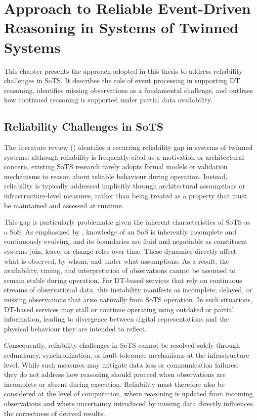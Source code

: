 \chapter{Approach to Reliable Event-Driven Reasoning in Systems of Twinned Systems}\label{ch:approach}
This chapter presents the approach adopted in this thesis to address reliability challenges in SoTS. It describes the role of event processing in supporting DT reasoning, identifies missing observations as a fundamental challenge, and outlines how continued reasoning is supported under partial data availability.



\section{Reliability Challenges in SoTS}

The literature review () identifies a recurring reliability gap in systems of twinned systems: although reliability is frequently cited as a motivation or architectural concern, existing SoTS research rarely adopts formal models or validation mechanisms to reason about reliable behaviour during operation. Instead, reliability is typically addressed implicitly through architectural assumptions or infrastructure-level measures, rather than being treated as a property that must be maintained and assessed at runtime.

This gap is particularly problematic given the inherent characteristics of SoTS as a SoS. As emphasized by \citet{jamshidi2008system}, knowledge of an SoS is inherently incomplete and continuously evolving, and its boundaries are fluid and negotiable as constituent systems join, leave, or change roles over time. These dynamics directly affect what is observed, by whom, and under what assumptions. As a result, the availability, timing, and interpretation of observations cannot be assumed to remain stable during operation. For DT-based services that rely on continuous streams of observational data, this instability manifests as incomplete, delayed, or missing observations that arise naturally from SoTS operation. In such situations, DT-based services may stall or continue operating using outdated or partial information, leading to divergence between digital representations and the physical behaviour they are intended to reflect.

Consequently, reliability challenges in SoTS cannot be resolved solely through redundancy, synchronization, or fault-tolerance mechanisms at the infrastructure level. While such measures may mitigate data loss or communication failures, they do not address how reasoning should proceed when observations are incomplete or absent during execution. Reliability must therefore also be considered at the level of computation, where  reasoning is updated from incoming observations and where uncertainty introduced by missing data directly influences the correctness of derived results.

